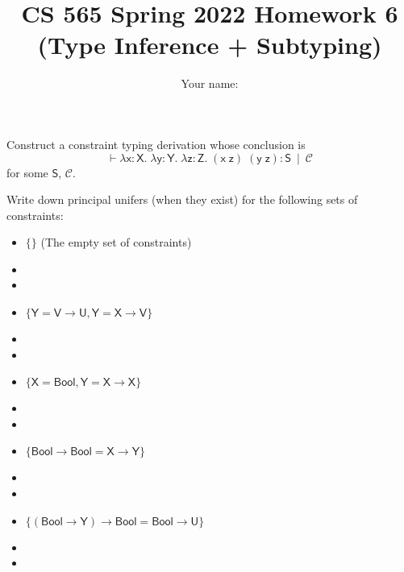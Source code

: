 \documentclass[12pt]{article}
\newenvironment{problem}[2][Problem]{\begin{trivlist}
\item[\hskip \labelsep {\bfseries #1}\hskip \labelsep {\bfseries #2.}]}{\end{trivlist}}
\begin{document}
\title{CS 565 Spring 2022 Homework 6 \\ (Type Inference + Subtyping)}
\author{Your name: \underline{\hspace{10cm}}}
\maketitle

\begin{problem}{1 (1 point)}
  Construct a constraint typing derivation whose conclusion is
  \[
    \vdash \mathsf{\lambda x : X.\; \lambda y : Y.\; \lambda z : Z.\; (x\;
      z)\; (y\; z) : S ~\mid~\mathcal{C}}
  \]
  for some $\mathsf{S}$, $\mathcal{C}$.
\end{problem}

\vspace{7cm}

\begin{problem}{2 (2 points)}
  Write down principal unifers (when they exist) for the following
  sets of constraints:
  \begin{itemize}

  \item $\mathsf{\{\}}$ (The empty set of constraints)
  \item[ ]
  \item[ ]

  \item $\mathsf{\{Y = V \rightarrow U, Y = X \rightarrow V\}}$
  \item[ ]
  \item[ ]

  \item $\mathsf{\{X = Bool, Y = X \rightarrow X\}}$
  \item[ ]
  \item[ ]

  \item $\mathsf{\{ Bool \rightarrow Bool = X \rightarrow Y \}}$
  \item[ ]
  \item[ ]

  \item $\mathsf{\{ (Bool \rightarrow Y) \rightarrow Bool = Bool \rightarrow U \}}$
  \item[ ]
  \item[ ]

  \end{itemize}
\end{problem}
\end{document}
